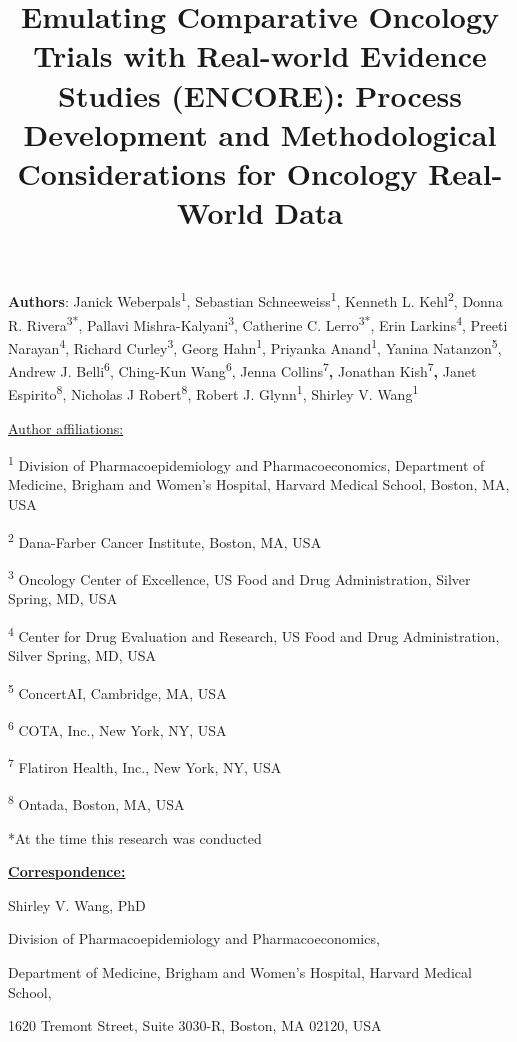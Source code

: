 \documentclass[
  letterpaper,
  DIV=11,
  numbers=noendperiod]{scrartcl}
\title{Emulating Comparative Oncology Trials with Real-world Evidence
Studies (ENCORE): Process Development and Methodological Considerations
for Oncology Real-World Data}
\author{}
\date{}
\begin{document}
\maketitle


\textbf{Authors}: Janick Weberpals\textsuperscript{1}, Sebastian
Schneeweiss\textsuperscript{1}, Kenneth L. Kehl\textsuperscript{2},
Donna R. Rivera\textsuperscript{3*}, Pallavi
Mishra-Kalyani\textsuperscript{3}, Catherine C.
Lerro\textsuperscript{3*}, Erin Larkins\textsuperscript{4}, Preeti
Narayan\textsuperscript{4}, Richard Curley\textsuperscript{3}, Georg
Hahn\textsuperscript{1}, Priyanka Anand\textsuperscript{1}, Yanina
Natanzon\textsuperscript{5}, Andrew J. Belli\textsuperscript{6},
Ching-Kun Wang\textsuperscript{6}, Jenna
Collins\textsuperscript{7}\textbf{,} Jonathan
Kish\textsuperscript{7}\textbf{,} Janet Espirito\textsuperscript{8},
Nicholas J Robert\textsuperscript{8}, Robert J.
Glynn\textsuperscript{1}, Shirley V. Wang\textsuperscript{1}

\ul{Author affiliations:}

\textsuperscript{1} Division of Pharmacoepidemiology and
Pharmacoeconomics, Department of Medicine, Brigham and Women's Hospital,
Harvard Medical School, Boston, MA, USA

\textsuperscript{2} Dana-Farber Cancer Institute, Boston, MA, USA

\textsuperscript{3} Oncology Center of Excellence, US Food and Drug
Administration, Silver Spring, MD, USA

\textsuperscript{4} Center for Drug Evaluation and Research, US Food and
Drug Administration, Silver Spring, MD, USA

\textsuperscript{5} ConcertAI, Cambridge, MA, USA

\textsuperscript{6} COTA, Inc., New York, NY, USA

\textsuperscript{7} Flatiron Health, Inc., New York, NY, USA

\textsuperscript{8} Ontada, Boston, MA, USA

*At the time this research was conducted

\ul{\textbf{Correspondence:}}

Shirley V. Wang, PhD

Division of Pharmacoepidemiology and Pharmacoeconomics,

Department of Medicine, Brigham and Women's Hospital, Harvard Medical
School,

1620 Tremont Street, Suite 3030-R, Boston, MA 02120, USA
\end{document}
